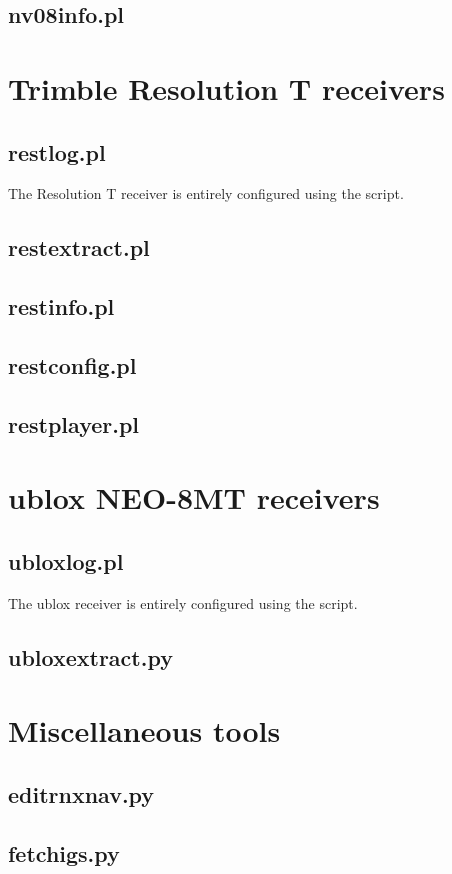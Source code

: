 \subsection{nv08info.pl}

\section{Trimble Resolution T receivers}

\subsection{restlog.pl}

\hypertarget{h:restlog}{}

The Resolution T receiver is entirely configured using the script.

\subsection{restextract.pl}

\subsection{restinfo.pl}

\subsection{restconfig.pl}

\subsection{restplayer.pl}

\section{ublox NEO-8MT receivers}

\subsection{ubloxlog.pl}

\hypertarget{h:ubloxlog}{}

The ublox receiver is entirely configured using the script.

\subsection{ubloxextract.py}




\section{Miscellaneous tools}



\subsection{editrnxnav.py}

\subsection{fetchigs.py}
